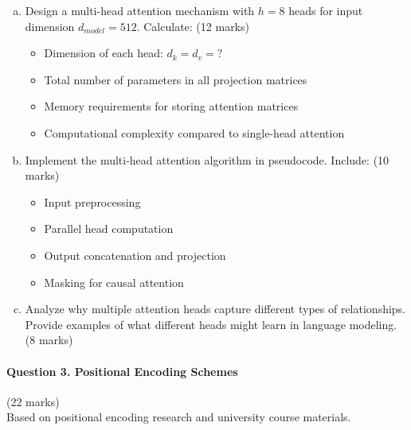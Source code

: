 \documentclass[12pt]{article}
\newcommand{\mediumanswer}{\vspace{3cm}}
\newcommand{\journalspace}{\vspace{4.5cm}}
\newcommand{\codespace}{\vspace{5cm}}
\begin{document}
\begin{enumerate}[(a)]
    \item Design a multi-head attention mechanism with $h=8$ heads for input dimension $d_{model}=512$. Calculate: \hfill (12 marks)
    \begin{itemize}
        \item Dimension of each head: $d_k = d_v = ?$
        \item Total number of parameters in all projection matrices
        \item Memory requirements for storing attention matrices
        \item Computational complexity compared to single-head attention
    \end{itemize}
    
    \journalspace
    
    \item Implement the multi-head attention algorithm in pseudocode. Include: \hfill (10 marks)
    \begin{itemize}
        \item Input preprocessing
        \item Parallel head computation
        \item Output concatenation and projection
        \item Masking for causal attention
    \end{itemize}
    
    \codespace
    
    \item Analyze why multiple attention heads capture different types of relationships. Provide examples of what different heads might learn in language modeling. \hfill (8 marks)
    
    \mediumanswer
\end{enumerate}

\newpage
\paragraph{Question 3. Positional Encoding Schemes}\hfill (22 marks)\\
Based on positional encoding research and university course materials.
\end{document}

